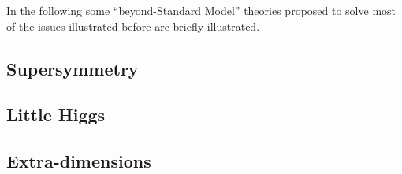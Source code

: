 In the following some ``beyond-Standard Model'' theories
proposed to solve most of the issues illustrated
before are briefly illustrated.


\subsection{Supersymmetry}\label{sec:susy}

\subsection{Little Higgs}

\subsection{Extra-dimensions}

